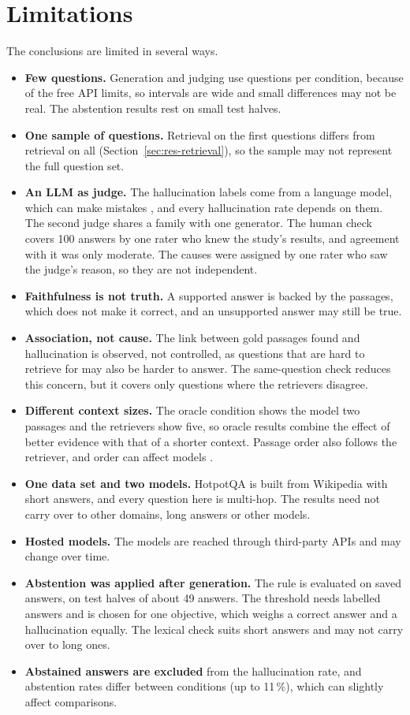 \section{Limitations}\label{sec:limitations}
The conclusions are limited in several ways.
\begin{itemize}
\item \textbf{Few questions.} Generation and judging use  questions per condition,
  because of the free API limits, so intervals are wide and small differences may not be real. The abstention
  results rest on small test halves.
\item \textbf{One sample of questions.} Retrieval on the first  questions differs from
  retrieval on all  (Section~\ref{sec:res-retrieval}), so the sample may not represent the full
  question set.
\item \textbf{An LLM as judge.} The hallucination labels come from a language model, which can make mistakes
  \cite{es2024ragas,niu2024ragtruth}, and every hallucination rate depends on them. The second judge shares a family with
  one generator. The human check covers 100 answers by one rater who knew the study's results, and agreement with it was only
  moderate. The causes were assigned by one rater who saw the judge's reason, so they are not independent.
\item \textbf{Faithfulness is not truth.} A supported answer is backed by the passages, which does not make it
  correct, and an unsupported answer may still be true.
\item \textbf{Association, not cause.} The link between gold passages found and hallucination is observed, not
  controlled, as questions that are hard to retrieve for may also be harder to answer. The same-question check reduces this
  concern, but it covers only questions where the retrievers disagree.
\item \textbf{Different context sizes.} The oracle condition shows the model two passages and the retrievers show
  five, so oracle results combine the effect of better evidence with that of a shorter context. Passage order also
  follows the retriever, and order can affect models \cite{liu2024lost}.
\item \textbf{One data set and two models.} HotpotQA is built from Wikipedia with short answers, and every
  question here is multi-hop. The results need not carry over to other domains, long answers or other models.
\item \textbf{Hosted models.} The models are reached through third-party APIs and may change over time.
\item \textbf{Abstention was applied after generation.} The rule is evaluated on saved answers, on test halves of about 49
  answers. The threshold needs labelled answers and is chosen for one objective, which weighs a correct answer and a
  hallucination equally. The lexical check suits short answers and may not carry over to long ones.
\item \textbf{Abstained answers are excluded} from the hallucination rate, and abstention rates differ between conditions (up
  to 11\,\%), which can slightly affect comparisons.
\end{itemize}

